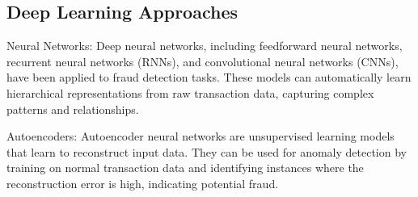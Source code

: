 \subsection{Deep Learning Approaches}
\hspace{\parindent}
Neural Networks: Deep neural networks, including feedforward neural networks, recurrent neural networks (RNNs), and convolutional neural networks (CNNs), have been applied to fraud detection tasks. These models can automatically learn hierarchical representations from raw transaction data, capturing complex patterns and relationships.

Autoencoders: Autoencoder neural networks are unsupervised learning models that learn to reconstruct input data. They can be used for anomaly detection by training on normal transaction data and identifying instances where the reconstruction error is high, indicating potential fraud.